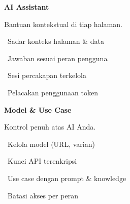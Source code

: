 \documentclass[a4paper]{article}
\begin{document}
\vspace{8pt}

\noindent
\begin{minipage}[t]{0.485\textwidth}
    \colorbox{PurplePrimary}{%
        \begin{minipage}{\dimexpr\textwidth-2\fboxsep\relax}
            {\fontsize{10}{13}\selectfont\bfseries\color{White} AI Assistant}
        \end{minipage}}\par
    \vspace{4pt}
    {\fontsize{9}{12}\selectfont\color{TextDark}%
    Bantuan kontekstual di tiap halaman.\par\vspace{3pt}
    \textbullet\ Sadar konteks halaman \& data\par\vspace{2pt}%
    \textbullet\ Jawaban sesuai peran pengguna\par\vspace{2pt}%
    \textbullet\ Sesi percakapan terkelola\par\vspace{2pt}%
    \textbullet\ Pelacakan penggunaan token}%

\end{minipage}%
\hfill
\begin{minipage}[t]{0.485\textwidth}
    \colorbox{BlueDark}{%
        \begin{minipage}{\dimexpr\textwidth-2\fboxsep\relax}
            {\fontsize{10}{13}\selectfont\bfseries\color{White} Model \& Use Case}
        \end{minipage}}\par
    \vspace{4pt}
    {\fontsize{9}{12}\selectfont\color{TextDark}%
    Kontrol penuh atas AI Anda.\par\vspace{3pt}
    \textbullet\ Kelola model (URL, varian)\par\vspace{2pt}%
    \textbullet\ Kunci API terenkripsi\par\vspace{2pt}%
    \textbullet\ Use case dengan prompt \& knowledge\par\vspace{2pt}%
    \textbullet\ Batasi akses per peran}%

\end{minipage}

\vspace{8pt}
\end{document}
